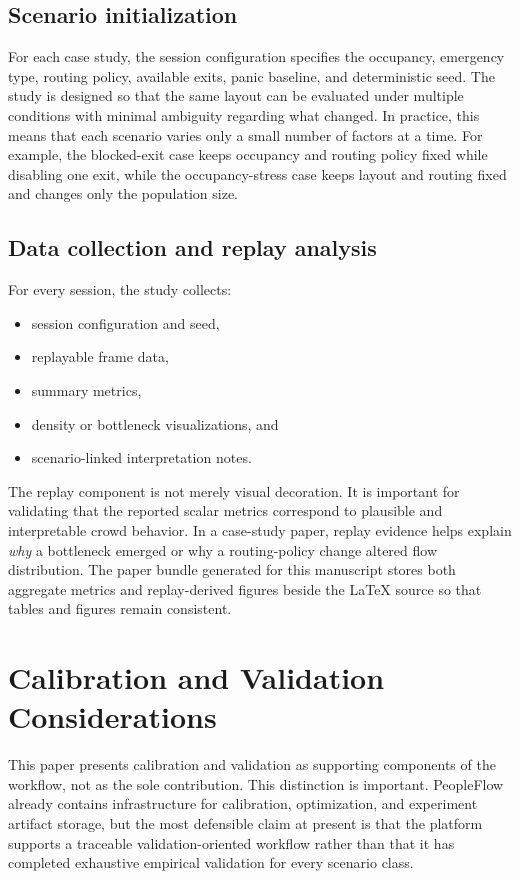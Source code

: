 \documentclass[conference]{IEEEtran}
\begin{document}
\subsection{Scenario initialization}

For each case study, the session configuration specifies the occupancy, emergency type, routing policy, available exits, panic baseline, and deterministic seed. The study is designed so that the same layout can be evaluated under multiple conditions with minimal ambiguity regarding what changed. In practice, this means that each scenario varies only a small number of factors at a time. For example, the blocked-exit case keeps occupancy and routing policy fixed while disabling one exit, while the occupancy-stress case keeps layout and routing fixed and changes only the population size.

\subsection{Data collection and replay analysis}

For every session, the study collects:
\begin{itemize}
    \item session configuration and seed,
    \item replayable frame data,
    \item summary metrics,
    \item density or bottleneck visualizations, and
    \item scenario-linked interpretation notes.
\end{itemize}

The replay component is not merely visual decoration. It is important for validating that the reported scalar metrics correspond to plausible and interpretable crowd behavior. In a case-study paper, replay evidence helps explain \emph{why} a bottleneck emerged or why a routing-policy change altered flow distribution. The paper bundle generated for this manuscript stores both aggregate metrics and replay-derived figures beside the \LaTeX{} source so that tables and figures remain consistent.

\section{Calibration and Validation Considerations}

This paper presents calibration and validation as supporting components of the workflow, not as the sole contribution. This distinction is important. PeopleFlow already contains infrastructure for calibration, optimization, and experiment artifact storage, but the most defensible claim at present is that the platform supports a traceable validation-oriented workflow rather than that it has completed exhaustive empirical validation for every scenario class.
\end{document}
